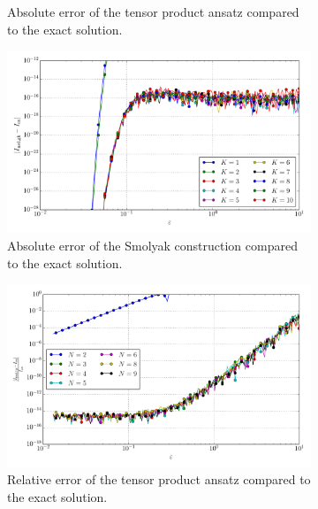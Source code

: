 \documentclass[a4paper,10pt]{article}
\begin{document}
\begin{figure}[ht!]
\begin{subfigure}[t]{0.5\linewidth}
    \caption{Absolute error of the tensor product ansatz compared to the exact solution.}
    \label{fig:tp_sg_3d_conv_p_400_040_err_nsd_tp}
  \end{subfigure}
  \begin{subfigure}[t]{0.5\linewidth}
    \includegraphics[width=\linewidth]{./plots/tp_sg_3d_conv_eps_(4,0,0)_(0,4,0)_err_nsd_gk.pdf}
    \caption{Absolute error of the Smolyak construction compared to the exact solution.}
    \label{fig:tp_sg_3d_conv_p_400_040_err_nsd_gk}
  \end{subfigure}
  \begin{subfigure}[t]{0.5\linewidth}
    \includegraphics[width=\linewidth]{./plots/tp_sg_3d_conv_eps_(4,0,0)_(0,4,0)_err_rel_nsd_tp.pdf}
    \caption{Relative error of the tensor product ansatz compared to the exact solution.}
    \label{fig:tp_sg_3d_conv_p_400_040_err_rel_nsd_tp}
  \end{subfigure}
  \begin{subfigure}[t]{0.5\linewidth}

\end{subfigure}
\end{figure}
\end{document}
